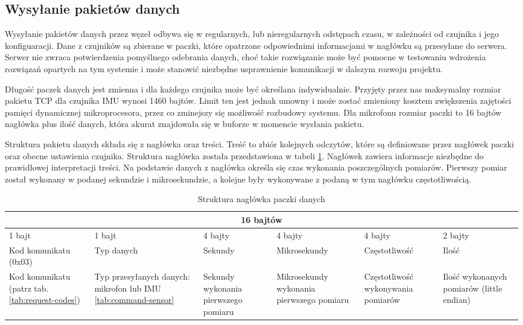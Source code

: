 \documentclass[12pt,oneside,a4paper]{book}
\theoremstyle{break}
\begin{document}
\subsection{Wysyłanie pakietów danych}
Wysyłanie pakietów danych przez węzeł odbywa się w regularnych, lub nieregularnych odstępach
czasu, w zależności od czujnika i jego konfiguaracji.
Dane z czujników są zbierane w paczki, które opatrzone odpowiednimi
informacjami w nagłówku są przesyłane do serwera. Serwer nie zwraca potwierdzenia
pomyślnego odebrania danych, choć takie rozwiązanie może być
pomocne w testowaniu
wdrożenia rozwiązań opartych na tym systemie i może stanowić niezbędne
usprawnienie komunikacji w dalszym rozwoju projektu.
\par Długość paczek danych jest zmienna i dla każdego czujnika może być określana indywidualnie.
Przyjęty przez nas maksymalny rozmiar pakietu TCP dla czujnika IMU
wynosi 1460 bajtów. Limit ten jest jednak
umowny i może zostać zmieniony kosztem zwiększenia zajętości pamięci dynamicznej mikroprocesora, 
przez co zminejszy się możliwość rozbudowy systemu. 
Dla mikrofonu rozmiar paczki to 16 bajtów nagłówka plus ilość danych,
która akurat znajdowała się w buforze 
w momencie wysłania pakietu.
\par Struktura pakietu danych składa się z nagłówka oraz treści. 
Treść to zbiór kolejnych odczytów, które są definiowane
przez nagłówek paczki oraz obecne ustawienia czujnika.
Struktura nagłówka została przedstawiona w tabeli \ref{tab:data-pack-header}.
Nagłówek zawiera informacje niezbędne do prawidłowej interpretacji treści.
Na podstawie danych z nagłówka określa się czas wykonania
poszczególnych pomiarów. Pierwszy pomiar został wykonany w 
podanej sekundzie i mikrosekundzie, a kolejne były wykonywane
z podaną w tym nagłówku częstotliwością.

\begin{table}[H]
    \centering
    \begin{tabularx}{\textwidth}{| X | X | X | X | X | X |}
    \hline
    \multicolumn{6}{|c|}{16 bajtów}\\
    \hline
    1 bajt 
    & 1 bajt
    & 4 bajty 
    & 4 bajty
    & 4 bajty 
    & 2 bajty \\
    \hline
    Kod komunikatu (0x03) 
    & Typ danych 
    & Sekundy
    & Mikrosekundy 
    & Częstotliwość 
    & Ilość \\
    \hline
    Kod komunikatu (patrz tab. \ref{tab:request-codes}) 
    & Typ przesyłanych danych: mikrofon lub IMU \ref{tab:command-sensor}
    & Sekundy wykonania pierwszego pomiaru 
    & Mikrosekundy wykonania pierwszego pomiaru 
    & Częstotliwość wykonywania pomiarów 
    & Ilość wykonanych pomiarów (little endian) \\
    \hline
    \end{tabularx}
    \caption{Struktura nagłówka paczki danych}
    \label{tab:data-pack-header}
\end{table}
\end{document}
